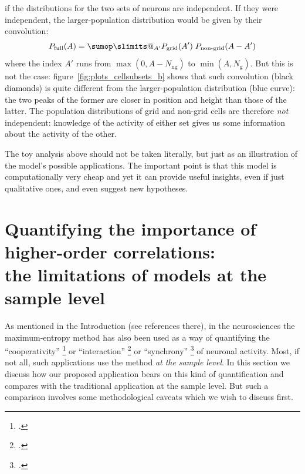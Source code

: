 \documentclass[\ifafour a4paper,12pt,\else a5paper,10pt,\fi%
onecolumn,oneside,article,%
british%
]{memoir}
\makeatletter
\theoremstyle{remark}
\theoremstyle{innote}
\def\sum{\DOTSI\sumop\slimits@}
\newcommand*{\citep}{\footcites}
\DeclarePairedDelimiter\set{\{}{\}}
\renewcommand*{\|}{\nonscript\,\vert\nonscript\;\mathopen{}}
\newcommand*{\eg}{{e.g.}}
\newcommand*{\yAv}{A}
\newcommand*{\yNg}{N_{\text{g}}}
\newcommand*{\yNng}{N_{\text{ng}}}
\newcommand*{\yA}{\yAv}%
\makeatother
\begin{document}
if the distributions for the two sets of neurons are independent. If they
were independent, the larger-population distribution would be given by
their convolution:
\begin{equation}
  \label{eq:convolution}
  P_{\text{full}}(\yA) = \sum_{\yA'} P_{\text{grid}}(\yA')\;
  P_{\text{non-grid}}(\yA-\yA') %
\end{equation}
where the index $\yA'$ runs from $\max(0,\yA-\yNng)$ to $\min(\yA,\yNg)$.
But this is not the case: 
figure~\ref{fig:plots_cellsubsets_b} shows that such convolution
(\textcolor{black}{black diamonds}) is quite different from the
larger-population distribution (\textcolor{myblue}{blue curve}): the two
peaks of the former are closer in position and height than those of the
latter. The population distributions of grid and non-grid cells are
therefore \emph{not} independent: knowledge of the activity of either set
gives us some information about the activity of the other.

\medskip

The toy analysis above should not be taken literally, but just as an
illustration of the model's possible applications. The important point is
that this model is computationally very cheap and yet it can provide
useful insights, even if just qualitative ones, and even suggest new
hypotheses.




\section{Quantifying the importance of higher-order correlations:\\
  the limitations of models at the sample level}
\label{sec:marginalization}

As mentioned in the Introduction (see references there), in the
neurosciences the maximum-entropy method has also been used as a way of
quantifying the \enquote{cooperativity} \citep[\eg][]{gersteinetal1985} or
\enquote{interaction}
\citep[\eg][]{martignonetal1995,schneidmanetal2006,shlensetal2006} or
\enquote{synchrony} \citep[\eg]{bohteetal2000,amarietal2003} of neuronal
activity. Most, if not all, such applications use the method \emph{at the
  sample level}. In this section we discuss how our proposed application
bears on this kind of quantification and compares with the traditional
application at the sample level. But such a comparison involves some
methodological caveats which we wish to discuss
first.%
\end{document}
